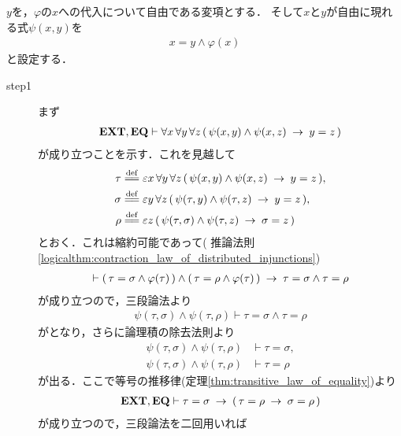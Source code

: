 	\begin{sketch}
		$y$を，$\varphi$の$x$への代入について自由である変項とする．
		そして$x$と$y$が自由に現れる式$\psi(x,y)$を
		\begin{align}
			x = y \wedge \varphi(x)
		\end{align}
		と設定する．
		\begin{description}
			\item[step1]
				まず
				\begin{align}
					\mbox{{\bf EXT}},\mbox{{\bf EQ}} \vdash \forall x\, \forall y\, \forall z\, 
					(\, \psi(x,y) \wedge \psi(x,z) \hspace{0.25em}\rightarrow\hspace{0.25em} y = z\, )
					\label{fom:thm_axiom_of_separation_1}
				\end{align}
				が成り立つことを示す．これを見越して
				\begin{align}
					\tau &\defeq \varepsilon x\, \forall y\, \forall z\, 
					(\, \psi(x,y) \wedge \psi(x,z) \rarrow y = z\, ), \\
					\sigma &\defeq \varepsilon y\, \forall z\, 
					(\, \psi(\tau,y) \wedge \psi(\tau,z) \rarrow y = z\, ), \\
					\rho &\defeq \varepsilon z\, 
					(\, \psi(\tau,\sigma) \wedge \psi(\tau,z) \rarrow \sigma = z\, )
				\end{align}
				とおく．これは縮約可能であって(
				推論法則\ref{logicalthm:contraction_law_of_distributed_injunctions})
				\begin{align}
					\vdash (\, \tau = \sigma \wedge \varphi(\tau)\, )
						\wedge (\, \tau = \rho \wedge \varphi(\tau)\, )
						\hspace{0.25em}\rightarrow\hspace{0.25em} \tau = \sigma \wedge \tau = \rho
				\end{align}
				が成り立つので，三段論法より
				\begin{align}
					\psi(\tau,\sigma) \wedge \psi(\tau,\rho) 
					\vdash \tau = \sigma \wedge \tau = \rho
				\end{align}
				がとなり，さらに論理積の除去法則より
				\begin{align}
					\psi(\tau,\sigma) \wedge \psi(\tau,\rho) &\vdash \tau = \sigma, \\
					\psi(\tau,\sigma) \wedge \psi(\tau,\rho) &\vdash \tau = \rho
				\end{align}
				が出る．ここで等号の推移律(定理\ref{thm:transitive_law_of_equality})より
				\begin{align}
					\mbox{{\bf EXT}},\mbox{{\bf EQ}} \vdash \tau = \sigma \hspace{0.25em}\rightarrow\hspace{0.25em} 
						(\, \tau = \rho \hspace{0.25em}\rightarrow\hspace{0.25em} \sigma = \rho\, )
				\end{align}
				が成り立つので，三段論法を二回用いれば
				\begin{align}

\end{align}
\end{description}
\end{sketch}
